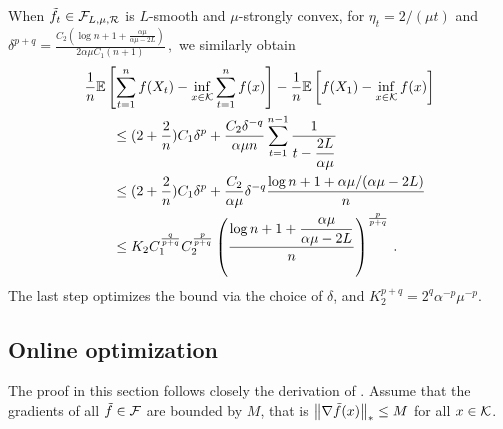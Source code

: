 When $\tilde{f}_t \in \mathcal{F}_{L,\mu, \mathcal{R}}$ is $L$-smooth and $\mu$-strongly convex, for
$\eta_t = 2/(\mu t)$ and 
$
\delta^{p+q} =  \tfrac{C_2\left( \log n+1+\tfrac{\alpha \mu}{\alpha \mu -2L}\right)}{2\alpha \mu C_1 (n+1)} \,,
$
we similarly obtain 
 \begin{align*}
 \MoveEqLeft
\frac{1}{n} \EE{ \sum_{t=1}^n f( X_t) - \inf_{x \in \cK} \sum_{t=1}^n f(x)} -\frac{1}{n}\EE{f(X_1)-\inf_{x \in \cK}f(x)}\\
&\le (2+\dfrac{2}{n})C_1\delta^p+\dfrac{C_2 \delta^{-q}}{\alpha \mu n} \sum_{t=1}^{n-1}\dfrac{1}{t-\dfrac{2L}{\alpha \mu}}\\
&\le (2+\dfrac{2}{n})C_1\delta^p+\dfrac{C_2 }{\alpha \mu}\delta^{-q} \dfrac{\log n+1+\alpha \mu/(\alpha \mu-2L)}{n}\\
&\le K_2C_1^{\frac{q}{p+q}}C_2^{\frac{p}{p+q}} \left( \frac{\log n+1+\dfrac{\alpha \mu}{\alpha \mu -2L}}{n} \right)^{\frac{p}{p+q}}\,.
 \end{align*}
The last step optimizes the bound via the choice of $\delta$, and
$K_2^{p+q}=2^{q}\alpha^{-p}\mu^{-p}$.



\subsection{Online optimization}
The proof in this section follows closely the derivation of \citet{saha2011improved}.
Assume that the gradients of all $\tilde{f} \in \mathcal{F}$ are bounded by $M$, that is $\left\|\nabla \tilde{f}(x)\right\|_* \le M$ for all $x \in \mathcal{K}$. 

